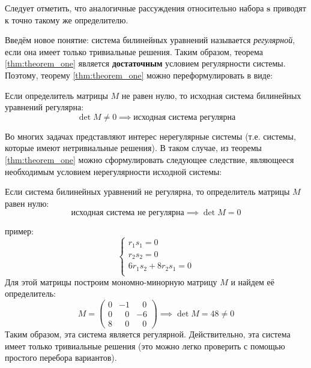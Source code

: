 Следует отметить, что аналогичные рассуждения относительно набора $\mathbf{s}$ приводят к точно 
такому же определителю. 

Введём новое понятие: система билинейных уравнений называется \textit{регулярной}, если она 
имеет только тривиальные решения. Таким образом, теорема \ref{thm:theorem_one} является 
\textbf{достаточным} условием регулярности системы. Поэтому, теорему \ref{thm:theorem_one} можно 
переформулировать в виде: 
\begin{theorem_alt}
Если определитель матрицы $M$ не равен нулю, то исходная система билинейных уравнений регулярна:
$$
\det M \ne 0 \implies\text{исходная система регулярна} 
$$
\end{theorem_alt}

Во многих задачах представляют интерес нерегулярные системы (т.е. системы, которые имеют 
нетривиальные 
решения). В таком случае, из теоремы \ref{thm:theorem_one} можно сформулировать следующее 
следствие, 
являющееся необходимым условием нерегулярности исходной системы:

\begin{consequence}
	Если система билинейных уравнений не регулярна, то определитель матрицы $M$ равен нулю:
	$$
	\text{исходная система не регулярна} \implies \det M = 0 
	$$
\end{consequence}

 пример:
\begin{equation*}
	\begin{cases}
		r_1 s_1 = 0 \\
		r_2 s_2 = 0 \\
		6 r_1 s_2 + 8 r_2 s_1 = 0 \\
	\end{cases}
\end{equation*}
Для этой матрицы построим мономно-минорную матрицу $M$ и найдем её определитель:
$$
	M =
	\begin{pmatrix}
	0 & -1 & \;\;\,0 \\
	0 & \;\;\,0 & -6 \\
	8 & \;\;\,0 & \;\;\,0 
	\end{pmatrix}
	\implies 
	\det M = 48 \ne 0
$$
Таким образом, эта система является регулярной. Действительно, эта система имеет только тривиальные решения (это можно легко проверить с помощью простого перебора вариантов).

